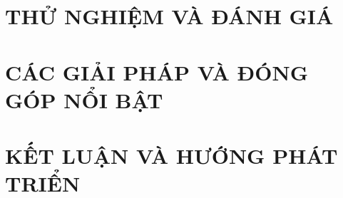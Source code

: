 \documentclass[a4paper,13pt,3p,twoside]{report}
\renewcommand{\bibname}{Danh_sach_tai_lieu_tham_khao}
\theoremstyle{definition}
\begin{document}
\chapter{THỬ NGHIỆM VÀ ĐÁNH GIÁ}
\label{chapter:Evaluation}


\newpage
\chapter{CÁC GIẢI PHÁP VÀ ĐÓNG GÓP NỔI BẬT}
\label{chapter:SolutionAndContribution}

\newpage
\chapter{KẾT LUẬN VÀ HƯỚNG PHÁT TRIỂN} %
\label{chapter:conclusion}




\newpage
\renewcommand\bibname{TÀI LIỆU THAM KHẢO}
\printbibliography
{}

\end{document}
